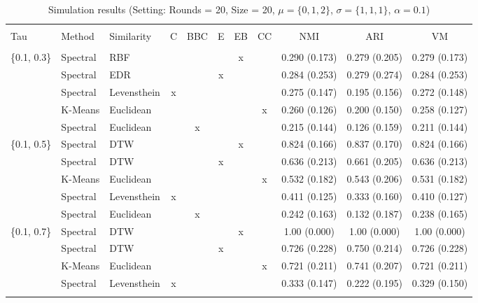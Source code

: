 \documentclass[12pt,a4paper,bibliography=totocnumbered,listof=totocnumbered]{scrartcl}
\begin{document}
\begin{appendix}
\begin{table}[!htbp] \centering 
	\label{} 
	\scriptsize
	\begin{tabularx}{\textwidth}{ lllcccccccc} \\
		\\[-1.8ex]	\toprule
		\\[-1.8ex] 
		Tau & Method & Similarity & C & BBC & E & EB & CC & NMI & ARI & VM \\ 
		\hline \\[-1.8ex] 
		\{0.1, 0.3\} & Spectral & RBF &  &  &  & x &  & 0.290 (0.173) & 0.279 (0.205) & 0.279 (0.173) \\ 
		& Spectral & EDR &  &  & x &  &  & 0.284 (0.253) & 0.279 (0.274) & 0.284 (0.253) \\ 
		& Spectral & Levensthein & x &  &  &  &  & 0.275 (0.147) & 0.195 (0.156) & 0.272 (0.148) \\ 
		& K-Means & Euclidean &  &  &  &  & x & 0.260 (0.126) & 0.200 (0.150) & 0.258 (0.127) \\ 
		& Spectral & Euclidean &  & x &  &  &  & 0.215 (0.144) & 0.126 (0.159) & 0.211 (0.144) \\ 
		\{0.1, 0.5\} & Spectral & DTW &  &  &  & x &  & 0.824 (0.166) & 0.837 (0.170) & 0.824 (0.166) \\ 
		& Spectral & DTW &  &  & x &  &  & 0.636 (0.213) & 0.661 (0.205) & 0.636 (0.213) \\ 
		& K-Means & Euclidean &  &  &  &  & x & 0.532 (0.182) & 0.543 (0.206) & 0.531 (0.182) \\ 
		& Spectral & Levensthein & x &  &  &  &  & 0.411 (0.125) & 0.333 (0.160) & 0.410 (0.127) \\ 
		& Spectral & Euclidean &  & x &  &  &  & 0.242 (0.163) & 0.132 (0.187) & 0.238 (0.165) \\ 
		\{0.1, 0.7\} & Spectral & DTW &  &  &  & x &  & 1.00 (0.000) & 1.00 (0.000) & 1.00 (0.000) \\ 
		& Spectral & DTW &  &  & x &  &  & 0.726 (0.228) & 0.750 (0.214) & 0.726 (0.228) \\ 
		& K-Means & Euclidean &  &  &  &  & x & 0.721 (0.211) & 0.741 (0.207) & 0.721 (0.211) \\ 
		& Spectral & Levensthein & x &  &  &  &  & 0.333 (0.147) & 0.222 (0.195) & 0.329 (0.150) \\ 
		\hline \\[-1.8ex] 
	\end{tabularx} 
	\caption{Simulation results (Setting: Rounds = 20, Size = 20, $\mu = \{0,1,2\}$, $\sigma =  \{1,1,1\}$, $\alpha = 0.1$)} 
\end{table} 



\end{appendix}
\end{document}
